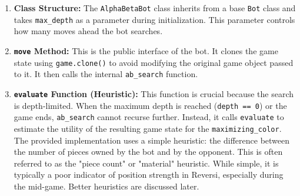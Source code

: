 \documentclass[11pt]{article}
\begin{document}
\begin{enumerate}
    \item \textbf{Class Structure:} The \texttt{AlphaBetaBot} class inherits from a base \texttt{Bot} class and takes \texttt{max\_depth} as a parameter during initialization. This parameter controls how many moves ahead the bot searches.

    \item \textbf{\texttt{move} Method:} This is the public interface of the bot. It clones the game state using \texttt{game.clone()} to avoid modifying the original game object passed to it. It then calls the internal \texttt{ab\_search} function.

    \item \textbf{\texttt{evaluate} Function (Heuristic):} This function is crucial because the search is depth-limited. When the maximum depth is reached (\texttt{depth == 0}) or the game ends, \texttt{ab\_search} cannot recurse further. Instead, it calls \texttt{evaluate} to estimate the utility of the resulting game state for the \texttt{maximizing\_color}. The provided implementation uses a simple heuristic: the difference between the number of pieces owned by the bot and by the opponent. This is often referred to as the "piece count" or "material" heuristic. While simple, it is typically a poor indicator of position strength in Reversi, especially during the mid-game. Better heuristics are discussed later.


\end{enumerate}
\end{document}
